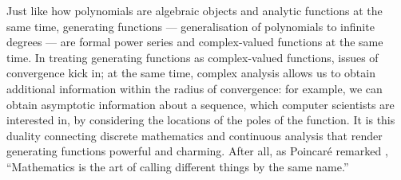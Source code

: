 \documentclass[a4paper, 12pt]{report}
\begin{document}
Just like how polynomials are algebraic objects and analytic functions at the same time, generating functions --- generalisation of polynomials to infinite degrees --- are formal power series and complex-valued functions at the same time. In treating generating functions as complex-valued functions, issues of convergence kick in; at the same time, complex analysis allows us to obtain additional information within the radius of convergence: for example, we can obtain asymptotic information about a sequence, which computer scientists are interested in, by considering the locations of the poles of the function. It is this duality connecting discrete mathematics and continuous analysis that render generating functions powerful and charming. After all, as Poincaré remarked \autocite[1]{zorich}, ``Mathematics is the art of calling different things by the same name.''


\nocite{*}
\printbibliography
\thispagestyle{empty}
\end{document}
